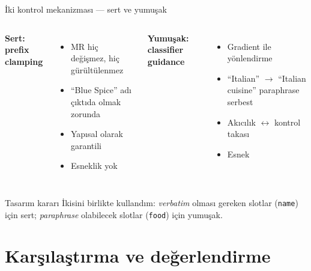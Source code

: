 \documentclass[10pt,aspectratio=169]{beamer}
\begin{document}
\begin{frame}{İki kontrol mekanizması --- sert ve yumuşak}
  \begin{columns}[T]
    \textbf{Sert: prefix clamping}
    \begin{itemize}
      \item MR hiç değişmez, hiç gürültülenmez
      \item ``Blue Spice'' adı çıktıda olmak zorunda
      \item Yapısal olarak garantili
      \item Esneklik yok
    \end{itemize}

    \textbf{Yumuşak: classifier guidance}
    \begin{itemize}
      \item Gradient ile yönlendirme
      \item ``Italian'' $\to$ ``Italian cuisine'' paraphrase serbest
      \item Akıcılık $\leftrightarrow$ kontrol takası
      \item Esnek
    \end{itemize}
  \end{columns}

  \vspace{0.8em}
  \begin{alertblock}{Tasarım kararı}
    İkisini birlikte kullandım: \emph{verbatim} olması gereken slotlar
    (\texttt{name}) için sert; \emph{paraphrase} olabilecek slotlar
    (\texttt{food}) için yumuşak.
  \end{alertblock}
\end{frame}

\section{Karşılaştırma ve değerlendirme}
\end{document}
